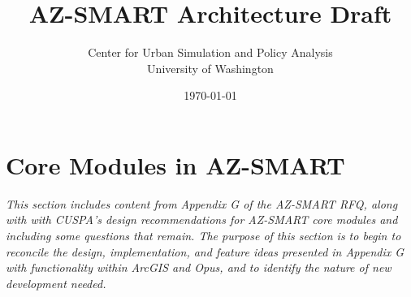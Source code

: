 \documentclass[titlepage]{article}
\begin{document}
\title{AZ-SMART Architecture Draft}
\author{Center for Urban Simulation and Policy Analysis\\University of Washington}
\date{\today}
\maketitle



\section{Core Modules in AZ-SMART}
\emph{This section includes content from Appendix G of the AZ-SMART RFQ, along with with CUSPA's design recommendations for AZ-SMART core modules and including some questions that remain.  The purpose of this section is to begin to reconcile the design, implementation, and feature ideas presented in Appendix G with functionality within ArcGIS and Opus, and to identify the nature of new development needed.}
\end{document}
